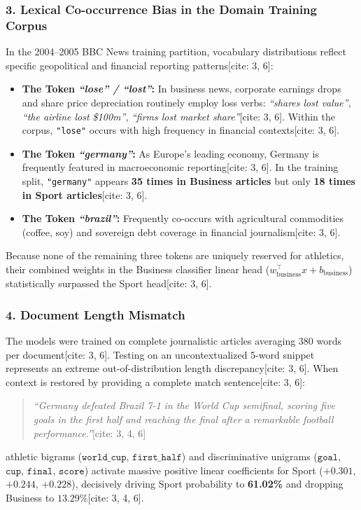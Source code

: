 \documentclass[11pt,a4paper]{article}
\begin{document}
	\subsubsection{3. Lexical Co-occurrence Bias in the Domain Training Corpus}
	In the 2004--2005 BBC News training partition, vocabulary distributions reflect specific geopolitical and financial reporting patterns[cite: 3, 6]:
	\begin{itemize}[leftmargin=1.5em, itemsep=0.2em]
		\item \textbf{The Token \textit{``lose'' / ``lost''}:} In business news, corporate earnings drops and share price depreciation routinely employ loss verbs: \textit{``shares lost value''}, \textit{``the airline lost \$100m''}, \textit{``firms lost market share''}[cite: 3, 6]. Within the corpus, \texttt{"lose"} occurs with high frequency in financial contexts[cite: 3, 6].
		\item \textbf{The Token \textit{``germany''}:} As Europe's leading economy, Germany is frequently featured in macroeconomic reporting[cite: 3, 6]. In the training split, \texttt{"germany"} appears \textbf{35 times in Business articles} but only \textbf{18 times in Sport articles}[cite: 3, 6].
		\item \textbf{The Token \textit{``brazil''}:} Frequently co-occurs with agricultural commodities (coffee, soy) and sovereign debt coverage in financial journalism[cite: 3, 6].
	\end{itemize}
	Because none of the remaining three tokens are uniquely reserved for athletics, their combined weights in the Business classifier linear head ($w_{\text{business}}^\top x + b_{\text{business}}$) statistically surpassed the Sport head[cite: 3, 6].
	
	\subsubsection{4. Document Length Mismatch}
	The models were trained on complete journalistic articles averaging $380$ words per document[cite: 3, 6]. Testing on an uncontextualized 5-word snippet represents an extreme out-of-distribution length discrepancy[cite: 3, 6]. When context is restored by providing a complete match sentence[cite: 3, 6]:
	\begin{quote}
		\textit{``Germany defeated Brazil 7-1 in the World Cup semifinal, scoring five goals in the first half and reaching the final after a remarkable football performance.''}[cite: 3, 4, 6]
	\end{quote}
	athletic bigrams ($\texttt{world\_cup}$, $\texttt{first\_half}$) and discriminative unigrams ($\texttt{goal}$, $\texttt{cup}$, $\texttt{final}$, $\texttt{score}$) activate massive positive linear coefficients for Sport ($+0.301$, $+0.244$, $+0.228$), decisively driving Sport probability to \textbf{61.02\%} and dropping Business to $13.29\%$[cite: 3, 4, 6].
	
\end{document}
